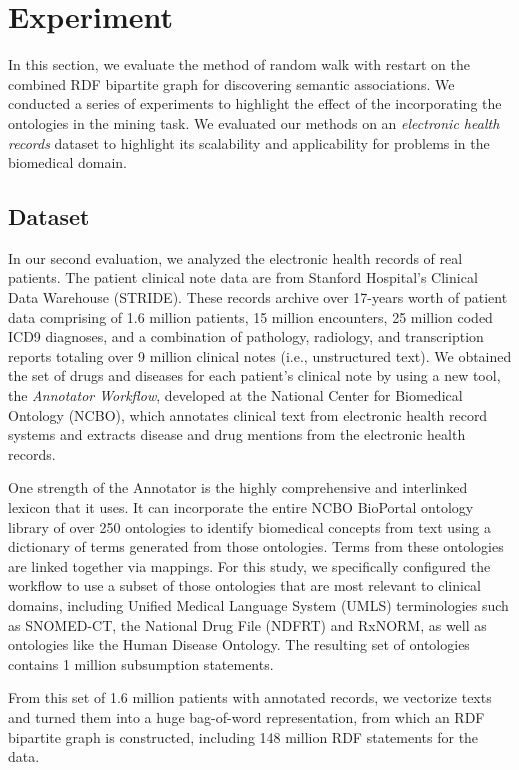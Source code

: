 \section{Experiment}
\label{experiment}
In this section, we evaluate the method of random walk with restart on the combined RDF bipartite graph for discovering semantic associations. We conducted a series of experiments to highlight the effect of the incorporating the ontologies in the mining task. We evaluated our methods on an \emph{electronic health records} dataset to highlight its scalability and applicability for problems in the biomedical domain.

\subsection{Dataset}
In our second evaluation, we analyzed the electronic health records of real patients. The patient clinical note data are from Stanford Hospital's Clinical Data Warehouse (STRIDE). These records archive over 17-years worth of patient data comprising of 1.6 million patients, 15 million encounters, 25 million coded ICD9 diagnoses, and a combination of pathology, radiology, and transcription reports totaling over 9 million clinical notes (i.e., unstructured text).
We obtained the set of drugs and diseases for each patient's clinical note by using a new tool, the \emph{Annotator Workflow}, developed at the National Center for Biomedical Ontology (NCBO), which annotates clinical text from electronic health record systems and extracts disease and drug mentions from the electronic health records.


One strength of the Annotator is the highly comprehensive and interlinked lexicon that it uses. It can incorporate the entire NCBO BioPortal ontology library of over 250 ontologies to identify biomedical concepts from text using a dictionary of terms generated from those ontologies. Terms from these ontologies are linked together via mappings. For this study, we specifically configured the workflow to use a subset of those ontologies that are most relevant to clinical domains, including Unified Medical Language System (UMLS) terminologies such as SNOMED-CT, the National Drug File (NDFRT) and RxNORM, as well as ontologies like the Human Disease Ontology. The resulting set of ontologies contains 1 million subsumption statements.

From this set of 1.6 million patients with annotated records, we vectorize texts and turned them into a huge bag-of-word representation, from which an RDF bipartite graph is constructed, including 148 million RDF statements for the data.

